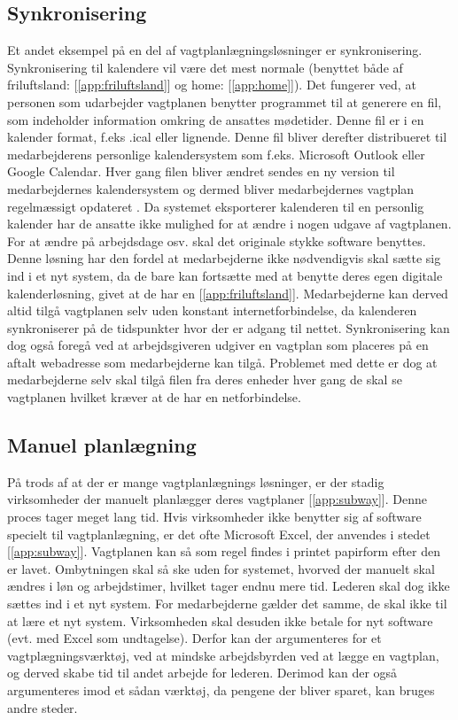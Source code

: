 \subsection{Synkronisering}
Et andet eksempel på en del af vagtplanlægningsløsninger er synkronisering. Synkronisering til kalendere vil være det mest normale (benyttet både af friluftsland: [\ref{app:friluftsland}] og home: [\ref{app:home}]). Det fungerer ved, at personen som udarbejder vagtplanen benytter programmet til at generere en fil, som indeholder information omkring de ansattes mødetider. Denne fil er i en kalender format, f.eks .ical eller lignende. Denne fil bliver derefter distribueret til medarbejderens personlige kalendersystem som f.eks. Microsoft Outlook eller Google Calendar. Hver gang filen bliver ændret sendes en ny version til medarbejdernes kalendersystem og dermed bliver medarbejdernes vagtplan regelmæssigt opdateret \citep{stage2005}. Da systemet eksporterer kalenderen til en personlig kalender har de ansatte ikke mulighed for at ændre i nogen udgave af vagtplanen. For at ændre på arbejdsdage osv. skal det originale stykke software benyttes. Denne løsning har den fordel at medarbejderne ikke nødvendigvis skal sætte sig ind i et nyt system, da de bare kan fortsætte med at benytte deres egen digitale kalenderløsning, givet at de har en [\ref{app:friluftsland}]. Medarbejderne kan derved altid tilgå vagtplanen selv uden konstant internetforbindelse, da kalenderen synkroniserer på de tidspunkter hvor der er adgang til nettet. Synkronisering kan dog også foregå ved at arbejdsgiveren udgiver en vagtplan som placeres på en aftalt webadresse som medarbejderne kan tilgå. Problemet med dette er dog at medarbejderne selv skal tilgå filen fra deres enheder hver gang de skal se vagtplanen hvilket kræver at de har en netforbindelse.\\

\subsection{Manuel planlægning}
På trods af at der er mange vagtplanlægnings løsninger, er der stadig virksomheder der manuelt planlægger deres vagtplaner [\ref{app:subway}]. Denne proces tager meget lang tid. Hvis virksomheder ikke benytter sig af software specielt til vagtplanlægning, er det ofte Microsoft Excel, der anvendes i stedet [\ref{app:subway}]. Vagtplanen kan så som regel findes i printet papirform efter den er lavet. Ombytningen skal så ske uden for systemet, hvorved der manuelt skal ændres i løn og arbejdstimer, hvilket tager endnu mere tid. Lederen skal dog ikke sættes ind i et nyt system. For medarbejderne gælder det samme, de skal ikke til at lære et nyt system. Virksomheden skal desuden ikke betale for nyt software (evt. med Excel som undtagelse). Derfor kan der argumenteres for et vagtplægningsværktøj, ved at mindske arbejdsbyrden ved at lægge en vagtplan, og derved skabe tid til andet arbejde for lederen. Derimod kan der også argumenteres imod et sådan værktøj, da pengene der bliver sparet, kan bruges andre steder.

